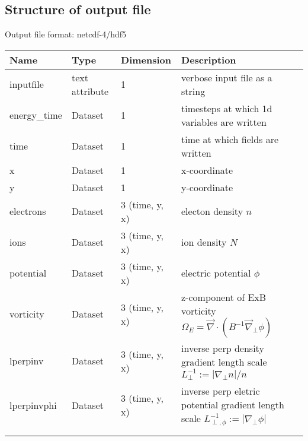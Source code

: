 \subsection{Structure of output file}
Output file format: netcdf-4/hdf5
%
\begin{longtable}{lll>{\RaggedRight}p{7cm}}
\toprule
\rowcolor{gray!50}\textbf{Name} & 
 \textbf{Type} & \textbf{Dimension} & \textbf{Description}  \\ \midrule
inputfile  &             text attribute & 1 & verbose input file as a string \\
energy\_time             & Dataset & 1 & timesteps at which 1d variables are 
written \\
time                     & Dataset & 1 & time at which fields are written \\
x                        & Dataset & 1 & x-coordinate  \\
y                        & Dataset & 1 & y-coordinate \\
electrons                & Dataset & 3 (time, y, x) & electon density $n$ \\
ions                     & Dataset & 3 (time, y, x) & ion density $N$ \\
potential                & Dataset & 3 (time, y, x) & electric potential $\phi$  
\\
vorticity                & Dataset & 3 (time, y, x) & z-component of ExB 
vorticity  $\Omega_E = \vec{\nabla}\cdot (B^{-1} \vec{\nabla}_{\perp}\phi)$  \\
lperpinv                 & Dataset & 3 (time, y, x) & inverse perp density gradient length scale $L_\perp^{-1} := |\nabla_\perp n| / n$ \\
lperpinvphi                 & Dataset & 3 (time, y, x) & inverse perp eletric potential gradient length scale $L_{\perp,\phi}^{-1} := |\nabla_\perp \phi| $ \\
\\
\\
\bottomrule
\end{longtable}




